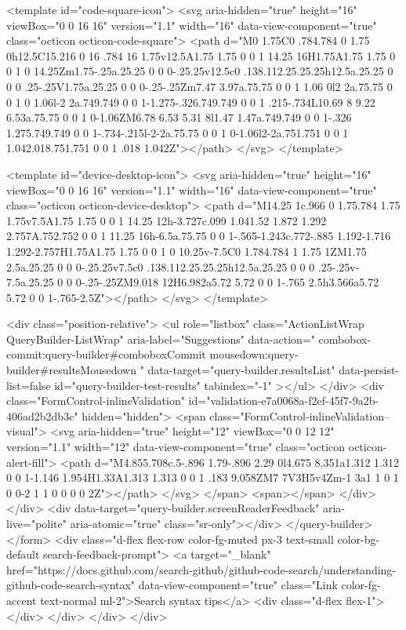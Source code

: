 <template id="code-square-icon">
  <svg aria-hidden="true" height="16" viewBox="0 0 16 16" version="1.1" width="16" data-view-component="true" class="octicon octicon-code-square">
    <path d="M0 1.75C0 .784.784 0 1.75 0h12.5C15.216 0 16 .784 16 1.75v12.5A1.75 1.75 0 0 1 14.25 16H1.75A1.75 1.75 0 0 1 0 14.25Zm1.75-.25a.25.25 0 0 0-.25.25v12.5c0 .138.112.25.25.25h12.5a.25.25 0 0 0 .25-.25V1.75a.25.25 0 0 0-.25-.25Zm7.47 3.97a.75.75 0 0 1 1.06 0l2 2a.75.75 0 0 1 0 1.06l-2 2a.749.749 0 0 1-1.275-.326.749.749 0 0 1 .215-.734L10.69 8 9.22 6.53a.75.75 0 0 1 0-1.06ZM6.78 6.53 5.31 8l1.47 1.47a.749.749 0 0 1-.326 1.275.749.749 0 0 1-.734-.215l-2-2a.75.75 0 0 1 0-1.06l2-2a.751.751 0 0 1 1.042.018.751.751 0 0 1 .018 1.042Z"></path>
</svg>
</template>

<template id="device-desktop-icon">
  <svg aria-hidden="true" height="16" viewBox="0 0 16 16" version="1.1" width="16" data-view-component="true" class="octicon octicon-device-desktop">
    <path d="M14.25 1c.966 0 1.75.784 1.75 1.75v7.5A1.75 1.75 0 0 1 14.25 12h-3.727c.099 1.041.52 1.872 1.292 2.757A.752.752 0 0 1 11.25 16h-6.5a.75.75 0 0 1-.565-1.243c.772-.885 1.192-1.716 1.292-2.757H1.75A1.75 1.75 0 0 1 0 10.25v-7.5C0 1.784.784 1 1.75 1ZM1.75 2.5a.25.25 0 0 0-.25.25v7.5c0 .138.112.25.25.25h12.5a.25.25 0 0 0 .25-.25v-7.5a.25.25 0 0 0-.25-.25ZM9.018 12H6.982a5.72 5.72 0 0 1-.765 2.5h3.566a5.72 5.72 0 0 1-.765-2.5Z"></path>
</svg>
</template>

        <div class="position-relative">
                <ul
                  role="listbox"
                  class="ActionListWrap QueryBuilder-ListWrap"
                  aria-label="Suggestions"
                  data-action="
                    combobox-commit:query-builder#comboboxCommit
                    mousedown:query-builder#resultsMousedown
                  "
                  data-target="query-builder.resultsList"
                  data-persist-list=false
                  id="query-builder-test-results"
                  tabindex="-1"
                ></ul>
        </div>
      <div class="FormControl-inlineValidation" id="validation-e7a0068a-f2ef-45f7-9a2b-406ad2b2db3c" hidden="hidden">
        <span class="FormControl-inlineValidation--visual">
          <svg aria-hidden="true" height="12" viewBox="0 0 12 12" version="1.1" width="12" data-view-component="true" class="octicon octicon-alert-fill">
    <path d="M4.855.708c.5-.896 1.79-.896 2.29 0l4.675 8.351a1.312 1.312 0 0 1-1.146 1.954H1.33A1.313 1.313 0 0 1 .183 9.058ZM7 7V3H5v4Zm-1 3a1 1 0 1 0 0-2 1 1 0 0 0 0 2Z"></path>
</svg>
        </span>
        <span></span>
</div>    </div>
    <div data-target="query-builder.screenReaderFeedback" aria-live="polite" aria-atomic="true" class="sr-only"></div>
</query-builder></form>
          <div class="d-flex flex-row color-fg-muted px-3 text-small color-bg-default search-feedback-prompt">
            <a target="_blank" href="https://docs.github.com/search-github/github-code-search/understanding-github-code-search-syntax" data-view-component="true" class="Link color-fg-accent text-normal ml-2">Search syntax tips</a>            <div class="d-flex flex-1"></div>
          </div>
        </div>
</div>


